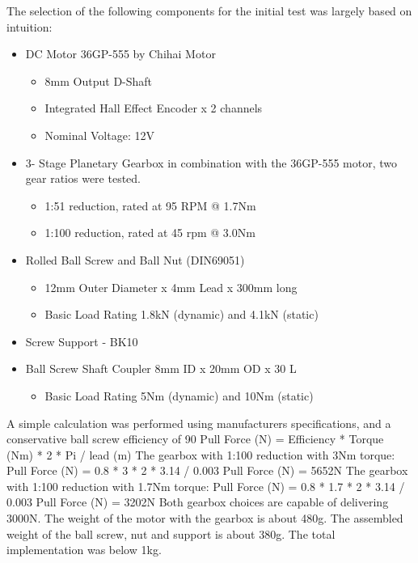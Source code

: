 The selection of the following components for the initial test was largely based on intuition:
\begin{itemize}
    \item DC Motor 36GP-555 by Chihai Motor
    \begin{itemize}
        \item 8mm Output D-Shaft 
        \item Integrated Hall Effect Encoder x 2 channels
        \item Nominal Voltage: 12V
    \end{itemize}
    \item 3- Stage Planetary Gearbox in combination with the 36GP-555 motor, two gear ratios were tested.
    \begin{itemize}
        \item 1:51 reduction, rated at 95 RPM @ 1.7Nm
        \item 1:100 reduction, rated at 45 rpm @ 3.0Nm
    \end{itemize} 
    \item  Rolled Ball Screw and Ball Nut (DIN69051)
    \begin{itemize}
        \item 12mm Outer Diameter x 4mm Lead x 300mm long
        \item Basic Load Rating 1.8kN (dynamic) and 4.1kN (static)
    \end{itemize}
    \item Screw Support - BK10
    \item Ball Screw Shaft Coupler 8mm ID x 20mm OD x 30 L
    \begin{itemize}
        \item Basic Load Rating 5Nm (dynamic) and 10Nm (static)
    \end{itemize}
\end{itemize}

    A simple calculation was performed using manufacturers specifications, and a conservative ball screw efficiency of 90%
Pull Force (N) = Efficiency * Torque (Nm) * 2 * Pi / lead (m)
The gearbox with 1:100 reduction with 3Nm torque:
Pull Force (N) = 0.8 * 3 * 2 * 3.14 / 0.003
Pull Force (N) = 5652N
The gearbox with 1:100 reduction with 1.7Nm torque:
Pull Force (N) = 0.8 * 1.7 * 2 * 3.14 / 0.003
Pull Force (N) = 3202N
Both gearbox choices are capable of delivering 3000N. The weight of the motor with the gearbox is about 480g. The assembled weight of the ball screw, nut and support is about 380g. The total implementation was below 1kg. 

